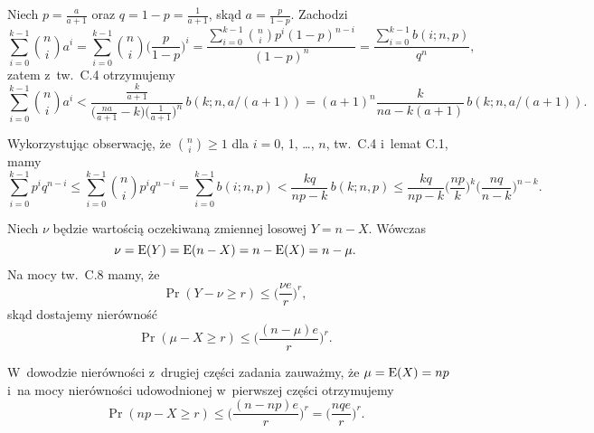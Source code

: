 \exercise %

\noindent Niech $p=\frac{a}{a+1}$ oraz $q=1-p=\frac{1}{a+1}$, skąd $a=\frac{p}{1-p}$.
Zachodzi
\[
	\sum_{i=0}^{k-1}\binom{n}{i}a^i = \sum_{i=0}^{k-1}\binom{n}{i}\biggl(\frac{p}{1-p}\biggr)^i = \frac{\sum_{i=0}^{k-1}\binom{n}{i}p^i(1-p)^{n-i}}{(1-p)^n} = \frac{\sum_{i=0}^{k-1}b(i;n,p)}{q^n},
\]
zatem z~tw.\ C.4 otrzymujemy
\[
	\sum_{i=0}^{k-1}\binom{n}{i}a^i < \frac{\frac{k}{a+1}}{\bigl(\frac{na}{a+1}-k\bigr)\bigl(\frac{1}{a+1}\bigr)^n}\,b(k;n,a/(a+1)) = (a+1)^n\frac{k}{na-k(a+1)}\,b(k;n,a/(a+1)).
\]

\exercise %
Wykorzystując obserwację, że $\binom{n}{i}\ge1$ dla $i=0$, 1, \dots, $n$, tw.\ C.4 i~lemat C.1, mamy
\[
	\sum_{i=0}^{k-1}p^iq^{n-i} \le \sum_{i=0}^{k-1}\binom{n}{i}p^iq^{n-i} = \sum_{i=0}^{k-1}b(i;n,p) < \frac{kq}{np-k}\,b(k;n,p) \le \frac{kq}{np-k}\biggl(\frac{np}{k}\biggr)^k\biggl(\frac{nq}{n-k}\biggr)^{n-k}.
\]

\exercise %

\noindent Niech $\nu$ będzie wartością oczekiwaną zmiennej losowej $Y=n-X$.
Wówczas
\[
        \nu = \operatorname{E}(Y) = \operatorname{E}(n-X) = n-\operatorname{E}(X) = n-\mu.
\]
Na mocy tw.\ C.8 mamy, że
\[
        \Pr(Y-\nu\ge r) \le \biggl(\frac{\nu e}{r}\biggr)^r,
\]
skąd dostajemy nierówność
\[
        \Pr(\mu-X\ge r) \le \biggl(\frac{(n-\mu)e}{r}\biggr)^r.
\]

W~dowodzie nierówności z~drugiej części zadania zauważmy, że $\mu=\operatorname{E}(X)=np$ i~na mocy nierówności udowodnionej w~pierwszej części otrzymujemy
\[
    \Pr(np-X\ge r) \le \biggl(\frac{(n-np)e}{r}\biggr)^r = \biggl(\frac{nqe}{r}\biggr)^r.
\]

\exercise %

